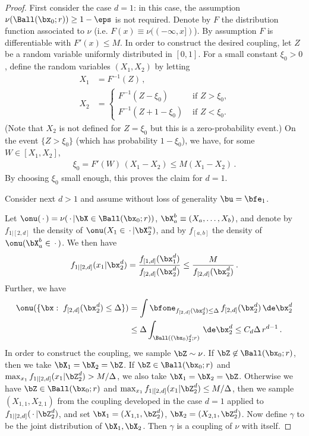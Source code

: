\documentclass[11pt]{article}
\begin{document}
\begin{proof}
First consider the case $d=1$: in this case, the assumption $\nu(\Ball(\bx_0;r))\ge 1-\eps$ is not required.
Denote by $F$ the distribution function associated to $\nu$ (i.e. $F(x) \equiv \nu((-\infty,x])$).
By assumption $F$ is differentiable with $F'(x)\le M$.
In order to construct the desired coupling, let $Z$ be a random variable uniformly distributed in $[0,1]$. For a small constant $\xi_0>0$,
define the random variables $(X_1,X_2)$ by letting
%
\begin{align}
%
X_1 & = F^{-1}(Z)\, ,\\
X_2 & =\begin{cases}
F^{-1}(Z-\xi_0) & \mbox{ if $Z>\xi_0$,}\\
F^{-1}(Z+1-\xi_0) & \mbox{ if $Z<\xi_0$.}
\end{cases}
%
\end{align}
%
(Note that $X_2$ is not defined for $Z=\xi_0$ but this is a zero-probability event.)
On the event $\{Z>\xi_0\}$ (which has probability $1-\xi_0$), we have,
for some $W\in [X_1,X_2]$,
%
\begin{align}
%
\xi_0 = F'(W) \, (X_1-X_2)\le M(X_1-X_2)\, .
%
\end{align}
%
By choosing $\xi_0$ small enough, this proves the claim for $d=1$.

Consider next $d>1$ and assume without loss of generality $\bu = \bfe_1$. 

Let   $\onu(\,\cdot\,) = \nu(\,\cdot\,|\bX\in\Ball(\bx_0;r))$, $\bX_a^b \equiv(X_a,\dots,X_b)$,
and denote by $f_{1|[2,d]}$ the density of $\onu(X_1\in\,\cdot\,|\bX_2^n)$,  and by $f_{[a,b]}$ the density of $\onu(\bX_a^b\in\,\cdot\,)$.
We then have
%
\begin{align}
%
f_{1|[2,d]}(x_1|\bx_2^d) = \frac{f_{[1,d]}(\bx_1^d)}{f_{[2,d]}(\bx_2^d)}\le \frac{M}{f_{[2,d]}(\bx_2^d)}\, .
%
\end{align}
%
Further, we have 
%
\begin{align}
%
\onu(\{\bx: \; f_{[2,d]}(\bx_2^d)\le\Delta\}) & = \int \bfone_{f_{[2,d]}(\bx_2^d)\le\Delta}\, f_{[2,d]}(\bx_2^d)\, \de \bx_2^d\\
& \le \Delta \int_{\Ball((\bx_0)_2^d ;r)}\, \de \bx_2^d \le C_d\Delta\, r^{d-1}\, .
%
\end{align}
%
In order to construct the coupling, we sample $\bZ\sim \nu$. If $\bZ\not\in\Ball(\bx_0;r)$, then we take $\bX_1 = \bX_2 = \bZ$.
If $\bZ\in\Ball(\bx_0;r)$ and $\max_{x_1}f_{1|[2,d]}(x_1|\bZ_2^d) > M/\Delta$, we also take $\bX_1 = \bX_2 = \bZ$. Otherwise we have $\bZ\in\Ball(\bx_0;r)$ and $\max_{x_1}f_{1|[2,d]}(x_1|\bZ_2^d)\le M/\Delta$, then we sample
$(X_{1,1},X_{2,1})$ from the coupling developed in the case $d=1$ applied to $f_{1|[2,d]}(\,\cdot\, |\bZ_2^d)$, and set $\bX_1 = (X_{1,1},\bZ_2^d)$, $\bX_2 = (X_{2,1},\bZ_2^d)$. Now define $\gamma$ to be the
joint distribution of $\bX_1, \bX_2$. Then $\gamma$ is a coupling of $\nu$ with itself. 



\end{proof}
\end{document}
